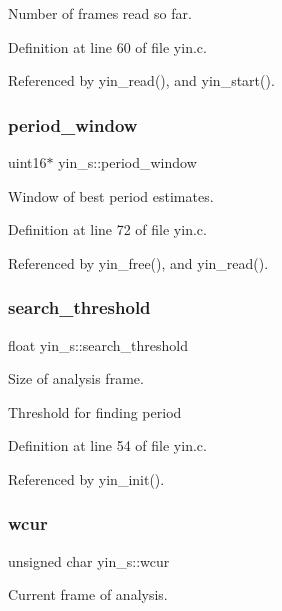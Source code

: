 Number of frames read so far. 



Definition at line 60 of file yin.\+c.



Referenced by yin\+\_\+read(), and yin\+\_\+start().

\mbox{\label{structyin__s_a1928cec127e250f6cd15249085bc9fc8}} 
\subsubsection{period\+\_\+window}
{\footnotesize\ttfamily uint16$\ast$ yin\+\_\+s\+::period\+\_\+window}



Window of best period estimates. 



Definition at line 72 of file yin.\+c.



Referenced by yin\+\_\+free(), and yin\+\_\+read().

\mbox{\label{structyin__s_a48c5ec4512b28c565a6daee092dd87f3}} 
\subsubsection{search\+\_\+threshold}
{\footnotesize\ttfamily float yin\+\_\+s\+::search\+\_\+threshold}



Size of analysis frame. 

Threshold for finding period 

Definition at line 54 of file yin.\+c.



Referenced by yin\+\_\+init().

\mbox{\label{structyin__s_ab79376deb3761d5d3ae72f727ac25660}} 
\subsubsection{wcur}
{\footnotesize\ttfamily unsigned char yin\+\_\+s\+::wcur}



Current frame of analysis. 



